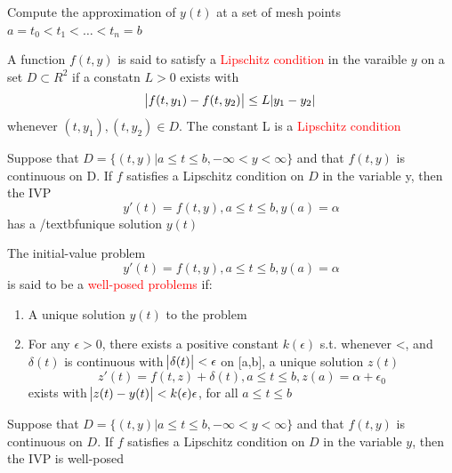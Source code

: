 \documentclass[11pt]{article}
\begin{document}
Compute the approximation of \(y(t)\) at a set of mesh points 
\(a=t_0<t_1<\dots<t_n=b\)

\begin{definition}
A function $f(t,y)$ is said to satisfy a \textcolor{red}{Lipschitz condition} in
the varaible $y$ on a set $D\subset R^2$ if a constatn $L>0$ exists with
\begin{equation*}
\abs{f(t,y_1)-f(t,y_2)}\le L\abs{y_1-y_2}
\end{equation*}
whenever $(t,y_1),(t,y_2)\in D$. The constant L is a 
\textcolor{red}{Lipschitz condition} 
\end{definition}

\begin{theorem}
Suppose that $D=\{(t,y)|a\le t\le b, -\infty<y<\infty\}$ and that $f(t,y)$ is continuous
on D. If $f$ satisfies a Lipschitz condition on $D$ in the variable y, then the IVP
\begin{equation*}
y'(t)=f(t,y), a\le t\le b, y(a) = \alpha
\end{equation*}
has a /textbf{unique solution} $y(t)$
\end{theorem}


\begin{definition}
The initial-value problem
\begin{equation*}
y'(t)=f(t,y), a\le t\le b, y(a)=\alpha
\end{equation*}
is said to be a \textcolor{red}{well-posed problems} if:
\begin{enumerate}
\item A unique solution $y(t)$ to the problem
\item For any $\epsilon>0$, there exists a positive constant $k(\epsilon)$ s.t.
whenever <\epsilon, and $\delta(t)$ is continuous with 
$\abs{\delta(t)}<\epsilon$ on [a,b], a unique solution $z(t)$ 
\begin{equation*}
z'(t)=f(t,z)+\delta(t), a\le t\le b, z(a)=\alpha+\epsilon_0
\end{equation*}
exists with $\abs{z(t)-y(t)}<k(\epsilon)\epsilon$, for all $a\le t\le b$
\end{enumerate}
\end{definition}

\begin{theorem}
Suppose that $D=\{(t,y)|a\le t\le b,-\infty<y<\infty\}$ and that $f(t,y)$ is continuous on $D$.
If $f$ satisfies a Lipschitz condition on $D$ in the variable $y$, then the IVP is well-posed
\end{theorem}
\end{document}
